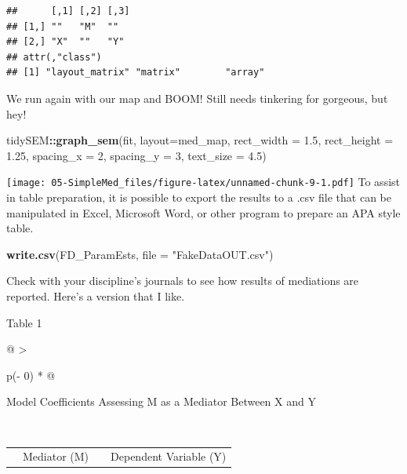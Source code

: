 \documentclass[
  11pt,
]{book}
\newenvironment{Shaded}{\begin{snugshade}}{\end{snugshade}}
\newcommand{\AttributeTok}[1]{\textcolor[rgb]{0.27,0.27,0.27}{#1}}
\newcommand{\DecValTok}[1]{\textcolor[rgb]{0.06,0.06,0.06}{#1}}
\newcommand{\FloatTok}[1]{\textcolor[rgb]{0.06,0.06,0.06}{#1}}
\newcommand{\FunctionTok}[1]{\textcolor[rgb]{0.27,0.27,0.27}{\textbf{#1}}}
\newcommand{\NormalTok}[1]{#1}
\newcommand{\SpecialCharTok}[1]{\textcolor[rgb]{0.43,0.43,0.43}{\textbf{#1}}}
\newcommand{\StringTok}[1]{\textcolor[rgb]{0.5,0.5,0.5}{#1}}
\begin{document}
\begin{verbatim}
##      [,1] [,2] [,3]
## [1,] ""   "M"  ""  
## [2,] "X"  ""   "Y" 
## attr(,"class")
## [1] "layout_matrix" "matrix"        "array"
\end{verbatim}

We run again with our map and BOOM! Still needs tinkering for gorgeous, but hey!

\begin{Shaded}
\begin{Highlighting}[]
\NormalTok{tidySEM}\SpecialCharTok{::}\FunctionTok{graph\_sem}\NormalTok{(fit, }\AttributeTok{layout=}\NormalTok{med\_map,  }\AttributeTok{rect\_width =} \FloatTok{1.5}\NormalTok{, }\AttributeTok{rect\_height =} \FloatTok{1.25}\NormalTok{, }\AttributeTok{spacing\_x =} \DecValTok{2}\NormalTok{, }\AttributeTok{spacing\_y =} \DecValTok{3}\NormalTok{, }\AttributeTok{text\_size =} \FloatTok{4.5}\NormalTok{)}
\end{Highlighting}
\end{Shaded}

\texttt{[image: 05-SimpleMed\_files/figure-latex/unnamed-chunk-9-1.pdf]} To assist in table preparation, it is possible to export the results to a .csv file that can be manipulated in Excel, Microsoft Word, or other program to prepare an APA style table.

\begin{Shaded}
\begin{Highlighting}[]
\FunctionTok{write.csv}\NormalTok{(FD\_ParamEsts, }\AttributeTok{file =} \StringTok{"FakeDataOUT.csv"}\NormalTok{)}
\end{Highlighting}
\end{Shaded}

Check with your discipline's journals to see how results of mediations are reported. Here's a version that I like.

Table 1

\begin{longtable}[]{@{}
  >{\raggedright\arraybackslash}p{(\columnwidth - 0\tabcolsep) * }@{}}
\toprule\noalign{}
\begin{minipage}[b]{\linewidth}\raggedright
Model Coefficients Assessing M as a Mediator Between X and Y
\end{minipage} \\
\midrule\noalign{}
\endhead
\bottomrule\noalign{}
\endlastfoot
\end{longtable}

\begin{longtable}[]{@{}
  >{\raggedright\arraybackslash}p{}
  >{\centering\arraybackslash}p{}
  >{\centering\arraybackslash}p{}
  >{\centering\arraybackslash}p{}@{}}
\toprule\noalign{}
\endhead
\bottomrule\noalign{}
\endlastfoot
& Mediator (M) & & Dependent Variable (Y) \\
\end{longtable}
\end{document}
